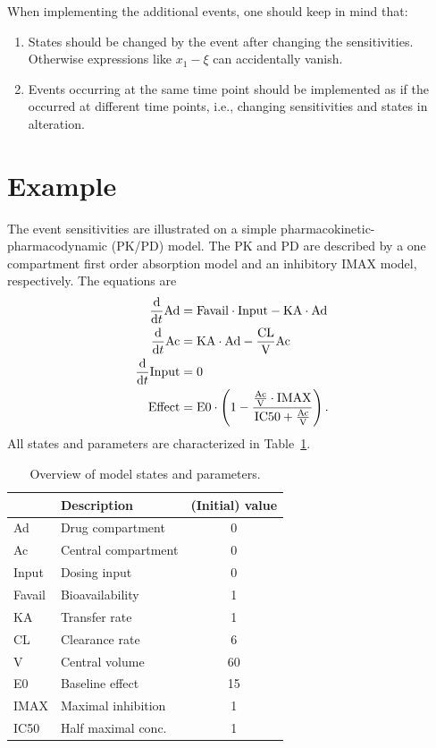 \documentclass[journal, a4paper]{IEEEtran}
\begin{document}
When implementing the additional events, one should keep in mind that:
\begin{enumerate}
	\item States should be changed by the event after changing the sensitivities. Otherwise expressions like $x_1 - \xi$ can accidentally vanish.
	\item Events occurring at the same time point should be implemented as if the occurred at different time points, i.e., changing sensitivities and states in alteration.
\end{enumerate}


\section{Example}

The event sensitivities are illustrated on a simple pharmacokinetic-pharmacodynamic (PK/PD) model. The PK and PD are described by a one compartment first order absorption model and an inhibitory IMAX model, respectively. The equations are
\begin{align}
  \frac{\rm d}{{\rm d}t}{\rm Ad} &= {\rm Favail}\cdot{\rm Input}-{\rm KA}\cdot{\rm Ad} \label{eq:ODE_1} \\ 
  \frac{\rm d}{{\rm d}t}{\rm Ac} &= {\rm KA}\cdot{\rm Ad}-\frac{\rm CL}{\rm V}{\rm Ac}\\
  \frac{\rm d}{{\rm d}t}{\rm Input} &= 0 \label{eq:ODE_3} \\
  {\rm Effect} &= {\rm E0}\cdot\left(1-\frac{\frac{\rm Ac}{\rm V}\cdot{\rm IMAX}}{{\rm IC50}+\frac{\rm Ac}{\rm V}}\right).\label{eq:effect}
\end{align}
All states and parameters are characterized in Table~\ref{tab:parameters}. 
\begin{table}[hb]
    \caption{Overview of model states and parameters.}
    \centering
    \begin{tabular}{l|l|c}
           & Description & (Initial) value \\
           \hline\hline
        Ad & Drug compartment & 0 \\
        Ac & Central compartment & 0\\
        Input & Dosing input & 0\\
        \hline
        Favail & Bioavailability & 1\\
        KA & Transfer rate & 1\\
        CL & Clearance rate & 6\\
        V & Central volume & 60\\
        E0 & Baseline effect & 15\\
        IMAX & Maximal inhibition & 1\\
        IC50 & Half maximal conc. & 1\\
        \hline
    \end{tabular}
    \label{tab:parameters}
\end{table}
\end{document}
